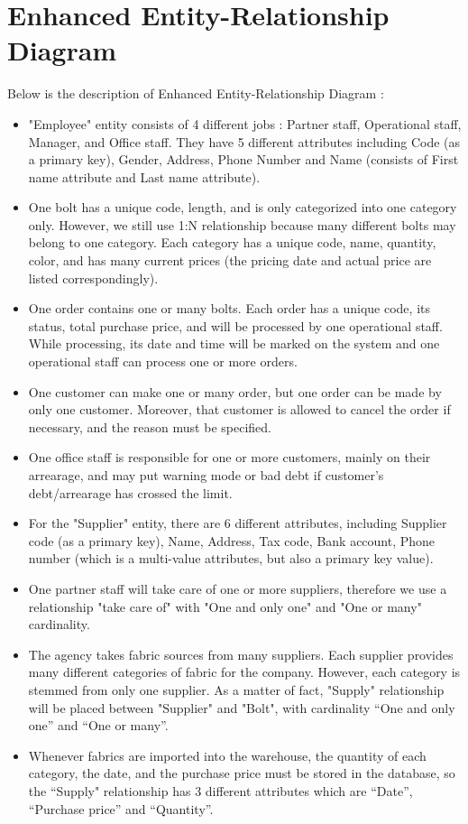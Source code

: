 \documentclass[a4paper]{article}
\begin{document}
\section{Enhanced Entity-Relationship Diagram}
Below is the description of Enhanced Entity-Relationship Diagram :
\begin{itemize}
    \item "Employee" entity consists of 4 different jobs : Partner staff, Operational staff, Manager, and Office staff. They have 5 different attributes including Code (as a primary key), Gender, Address, Phone Number and Name (consists of First name attribute and Last name attribute).
    \item One bolt has a unique code, length, and is only categorized into one category only. However, we still use 1:N relationship because many different bolts may belong to one category. Each category has a unique code, name, quantity, color, and has many current prices (the pricing date and actual price are listed correspondingly).
    \item One order contains one or many bolts. Each order has a unique code, its status, total purchase price, and will be processed by one operational staff. While processing, its date and time will be marked on the system and one operational staff can process one or more orders.
    \item One customer can make one or many order, but one order can be made by only one customer. Moreover, that customer is allowed to cancel the order if necessary, and the reason must be specified.
    \item One office staff is responsible for one or more customers, mainly on their arrearage, and may put warning mode or bad debt if customer's debt/arrearage has crossed the limit.
    \item For the "Supplier" entity, there are 6 different attributes, including Supplier code (as a primary key), Name, Address, Tax code, Bank account, Phone number (which is a multi-value attributes, but also a primary key value).
    \item One partner staff will take care of one or more suppliers, therefore we use a relationship "take care of" with "One and only one" and "One or many" cardinality.
    \item The agency takes fabric sources from many suppliers. Each supplier provides many different categories of fabric for the company. However, each category is stemmed from only one supplier. As a matter of fact, "Supply" relationship will be placed between "Supplier" and "Bolt", with cardinality “One and only one” and “One or many”.
    \item Whenever fabrics are imported into the warehouse, the quantity of each category, the date, and the purchase price must be stored in the database, so the “Supply" relationship has 3 different attributes which are “Date”, “Purchase price” and “Quantity”.
\end{itemize}
\end{document}

